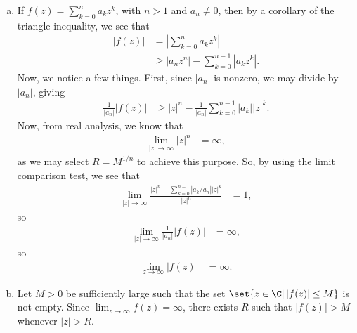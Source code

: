 \documentclass[11pt]{mypackage}
\begin{document}
\begin{solution}\hfill
  \begin{enumerate}[(a)]
    \item If $f(z) = \sum_{k=0}^{n} a_kz^{k}$, with $n > 1$ and $a_n \neq 0$, then by a corollary of the triangle inequality, we see that
      \begin{align*}
        \left\vert f(z) \right\vert &= \left\vert \sum_{k=0}^{n}a_kz^{k} \right\vert\\
                                    &\geq \left\vert a_nz^{n} \right\vert - \sum_{k=0}^{n-1}\left\vert a_kz^{k} \right\vert.
      \end{align*}
      Now, we notice a few things. First, since $\left\vert a_n \right\vert$ is nonzero, we may divide by $\left\vert a_n \right\vert$, giving
      \begin{align*}
        \frac{1}{\left\vert a_n \right\vert} \left\vert f(z) \right\vert &\geq \left\vert z \right\vert^{n} - \frac{1}{\left\vert a_n \right\vert} \sum_{k=0}^{n-1} \left\vert a_k \right\vert \left\vert z \right\vert^{k}.
      \end{align*}
      Now, from real analysis, we know that
      \begin{align*}
        \lim_{|z|\rightarrow\infty} |z|^{n} &= \infty,
      \end{align*}
      as we may select $R = M^{1/n}$ to achieve this purpose. So, by using the limit comparison test, we see that
      \begin{align*}
        \lim_{|z|\rightarrow\infty} \frac{\left\vert z \right\vert^{n} - \sum_{k=0}^{n-1} \left\vert a_k/a_n \right\vert \left\vert z \right\vert^{k}}{\left\vert z \right\vert^{n}} &= 1,
      \end{align*}
      so
      \begin{align*}
        \lim_{\left\vert z \right\vert\rightarrow\infty} \frac{1}{\left\vert a_n \right\vert} \left\vert f(z) \right\vert &= \infty,
      \end{align*}
      so
      \begin{align*}
        \lim_{z\rightarrow\infty} \left\vert f(z) \right\vert &= \infty.
      \end{align*}
    \item Let $M > 0$ be sufficiently large such that the set $\set{z\in \C | \left\vert f(z) \right\vert \leq M}$ is not empty. Since $\lim_{z\rightarrow\infty} f(z) = \infty$, there exists $R$ such that $\left\vert f(z) \right\vert > M$ whenever $\left\vert z \right\vert > R$.\newline


\end{enumerate}
\end{solution}
\end{document}
